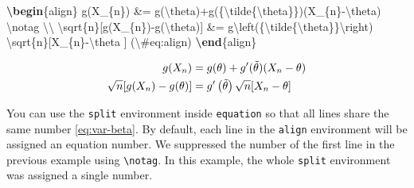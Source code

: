 \documentclass[
  12pt,
]{krantz}
\newenvironment{Shaded}{\begin{snugshade}}{\end{snugshade}}
\newcommand{\ExtensionTok}[1]{#1}
\newcommand{\KeywordTok}[1]{\textcolor[rgb]{0.13,0.29,0.53}{\textbf{#1}}}
\newcommand{\NormalTok}[1]{#1}
\newcommand{\SpecialCharTok}[1]{\textcolor[rgb]{0.00,0.00,0.00}{#1}}
\newcommand{\SpecialStringTok}[1]{\textcolor[rgb]{0.31,0.60,0.02}{#1}}
\theoremstyle{definition}
\theoremstyle{definition}
\theoremstyle{definition}
\theoremstyle{definition}
\theoremstyle{remark}
\begin{document}
\begin{Shaded}
\begin{Highlighting}[]
\KeywordTok{\textbackslash{}begin}\NormalTok{\{}\ExtensionTok{align}\NormalTok{\}}\SpecialStringTok{ }
\SpecialStringTok{g(X\_\{n\}) \&= g(}\SpecialCharTok{\textbackslash{}theta}\SpecialStringTok{)+g\textquotesingle{}(\{}\SpecialCharTok{\textbackslash{}tilde}\SpecialStringTok{\{}\SpecialCharTok{\textbackslash{}theta}\SpecialStringTok{\}\})(X\_\{n\}{-}}\SpecialCharTok{\textbackslash{}theta}\SpecialStringTok{) }\SpecialCharTok{\textbackslash{}notag}\SpecialStringTok{ }\SpecialCharTok{\textbackslash{}\textbackslash{}}
\SpecialCharTok{\textbackslash{}sqrt}\SpecialStringTok{\{n\}[g(X\_\{n\}){-}g(}\SpecialCharTok{\textbackslash{}theta}\SpecialStringTok{)] \&= g\textquotesingle{}}\SpecialCharTok{\textbackslash{}left}\SpecialStringTok{(\{}\SpecialCharTok{\textbackslash{}tilde}\SpecialStringTok{\{}\SpecialCharTok{\textbackslash{}theta}\SpecialStringTok{\}\}}\SpecialCharTok{\textbackslash{}right}\SpecialStringTok{)}
\SpecialStringTok{  }\SpecialCharTok{\textbackslash{}sqrt}\SpecialStringTok{\{n\}[X\_\{n\}{-}}\SpecialCharTok{\textbackslash{}theta}\SpecialStringTok{ ] (}\SpecialCharTok{\textbackslash{}\#}\SpecialStringTok{eq:align)}
\KeywordTok{\textbackslash{}end}\NormalTok{\{}\ExtensionTok{align}\NormalTok{\} }
\end{Highlighting}
\end{Shaded}

\begin{align}
g(X_{n}) &= g(\theta)+g'({\tilde{\theta}})(X_{n}-\theta) \notag \\
\sqrt{n}[g(X_{n})-g(\theta)] &= g'\left({\tilde{\theta}}\right)
  \sqrt{n}[X_{n}-\theta ] \label{eq:align}
\end{align}

You can use the \texttt{split} environment inside \texttt{equation} so that all lines share the same number \eqref{eq:var-beta}. By default, each line in the \texttt{align} environment will be assigned an equation number. We suppressed the number of the first line in the previous example using \texttt{\textbackslash{}notag}. In this example, the whole \texttt{split} environment was assigned a single number.
\end{document}
